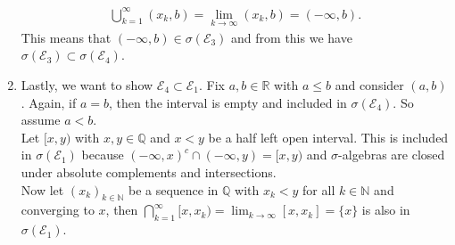 \begin{solution}
\begin{enumerate}
    \begin{align}
        \bigcup_{k=1}^\infty (x_k, b) = \lim_{k \rightarrow \infty} (x_k, b) = (-\infty, b) \text{.}
    \end{align}
    This means that \((-\infty, b) \in \sigma (\mathcal{E}_3)\) and from this we have \(\sigma (\mathcal{E}_3) \subset \sigma (\mathcal{E}_4)\).
    \item Lastly, we want to show \(\mathcal{E}_4 \subset \mathcal{E}_1\). Fix \(a, b \in \mathbb{R}\) with \(a \leq b\) and consider \((a, b)\). Again, if \(a = b\), then the interval is empty and included in \(\sigma (\mathcal{E}_4) \). So assume \(a < b\). \\
    Let \( [x, y)\) with \(x, y \in \mathbb{Q}\) and \(x < y\) be a half left open interval. This is included in \(\sigma( \mathcal{E}_1)\) because \((-\infty, x)^c \cap (-\infty, y) = [x, y)\) and \(\sigma\)-algebras are closed under absolute complements and intersections. \\
    Now let \((x_k)_{k \in \mathbb{N}}\) be a sequence in \(\mathbb{Q}\) with \(x_k < y\) for all \(k \in \mathbb{N}\) and converging to \(x\), then \(\bigcap_{k = 1}^\infty [x, x_k) = \lim_{k \rightarrow \infty} [x, x_k]= \{x\}\) is also in \(\sigma(\mathcal{E}_1)\).
    \end{enumerate}
\end{solution}